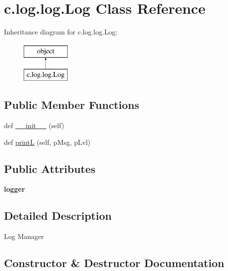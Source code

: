 \hypertarget{classc_1_1log_1_1log_1_1_log}{}\section{c.\+log.\+log.\+Log Class Reference}
\label{classc_1_1log_1_1log_1_1_log}
Inheritance diagram for c.\+log.\+log.\+Log\+:\begin{figure}[H]
\begin{center}
\leavevmode
\includegraphics[height=2.000000cm]{classc_1_1log_1_1log_1_1_log}
\end{center}
\end{figure}
\subsection*{Public Member Functions}
\begin{DoxyCompactItemize}
\item 
def \hyperlink{classc_1_1log_1_1log_1_1_log_a0a917cf551a696f5b88d3c6009d28231}{\+\_\+\+\_\+init\+\_\+\+\_\+} (self)
\item 
def \hyperlink{classc_1_1log_1_1log_1_1_log_a977c784820cb297847489ab6befc0439}{print\+L} (self, p\+Msg, p\+Lvl)
\end{DoxyCompactItemize}
\subsection*{Public Attributes}
\begin{DoxyCompactItemize}
\item 
\hypertarget{classc_1_1log_1_1log_1_1_log_a774382f50192f9567963e6676fb6bbae}{}{\bfseries logger}\label{classc_1_1log_1_1log_1_1_log_a774382f50192f9567963e6676fb6bbae}

\end{DoxyCompactItemize}


\subsection{Detailed Description}
\begin{DoxyVerb}Log Manager
\end{DoxyVerb}
 

\subsection{Constructor \& Destructor Documentation}
\hypertarget{classc_1_1log_1_1log_1_1_log_a0a917cf551a696f5b88d3c6009d28231}{}
